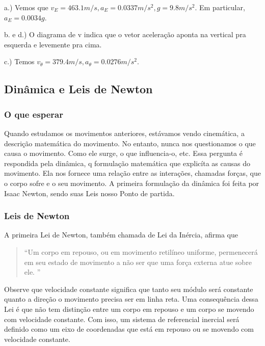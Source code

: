 \documentclass{article}
\begin{document}
  a.) Vemos que $v_{E} = 463.1m/s, a_{E} = 0.0337m/s^{2}, g = 9.8m/s^{2}$. Em particular, $a_{E} = 0.0034g.$
  
  b. e d.) O diagrama de v indica que o vetor acelera\c c\~ao aponta na vertical pra esquerda e levemente pra cima.

  c.) Temos $v_{\theta} = 379.4m/s, a_{\theta}=0.0276m/s^{2}.$

\subsection{Din\^amica e Leis de Newton}
\subsubsection{O que esperar}
 Quando estudamos os movimentos anteriores, est\'avamos vendo cinem\'atica, a descri\c c\~ao matem\'atica do movimento. No entanto,
nunca nos questionamos o que causa o movimento. Como ele surge, o que influencia-o, etc. Essa pergunta \'e respondida pela din\^amica,
q formula\c c\~ao matem\'atica que explic\'ita as causas do movimento. Ela nos fornece uma rela\c c\~ao entre as intera\c c\~oes, chamadas for\c cas,
que o corpo sofre e o seu movimento. A primeira formula\c c\~ao da din\^amica foi feita por Isaac Newton, sendo suas Leis nosso Ponto de partida.

\subsubsection{Leis de Newton}
  A primeira Lei de Newton, tamb\'em chamada de Lei da In\'ercia, afirma que 
  \begin{quote}
    ``Um corpo em repouso, ou em movimento retil\'ineo uniforme, permenecer\'a em seu estado de movimento a n\~ao ser que uma
    for\c ca externa atue sobre ele. ''
  \end{quote}
  Observe que velocidade constante significa que tanto seu m\'odulo ser\'a constante quanto a dire\c c\~ao o movimento precisa ser em linha reta.
  Uma consequ\^encia dessa Lei \'e que n\~ao tem distin\c c\~ao entre um corpo em repouso e um corpo se movendo com velocidade constante.
  Com isso, um sistema de referencial inercial ser\'a definido como um eixo de coordenadas que est\'a em repouso ou se movendo com
  velocidade constante.
\end{document}
